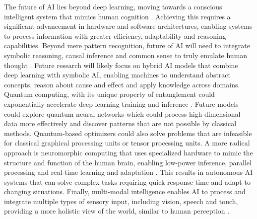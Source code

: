\documentclass[preprint,12pt]{elsarticle}
\begin{document}
The future of AI lies beyond deep learning, moving towards a conscious intelligent system that mimics human cognition \citep{butlin_consciousness_2023}. Achieving this requires a significant advancement in hardware and software architectures, enabling systems to process information with greater efficiency, adaptability and reasoning capabilities. Beyond mere pattern recognition, future of AI will need to integrate symbolic reasoning, causal inference and common sense to truly emulate human thought \citep{marra_statistical_2024, colelough_neuro-symbolic_2025, bhuyan_neuro-symbolic_2024}. Future research will likely focus on hybrid AI models that combine deep learning with symbolic AI, enabling machines to understand abstract concepts, reason about cause and effect and apply knowledge across domains. Quantum computing, with its unique property of entanglement could exponentially accelerate deep learning training and inference \citep{wu_survey_2025, klusch_quantum_2024}. Future models could explore quantum neural networks which could process high dimensional data more effectively and discover patterns that are not possible by classical methods. Quantum-based optimizers could also solve problems that are infeasible for classical graphical processing units or tensor processing units. A more radical approach is neuromorphic computing that uses specialized hardware to mimic the structure and function of the human brain, enabling low-power inference, parallel processing and real-time learning and adaptation \citep{shrestha_survey_2022, kudithipudi_neuromorphic_2025}. This results in autonomous AI systems that can solve complex tasks requiring quick response time and adapt to changing situations. Finally, multi-modal intelligence enables AI to process and integrate multiple types of sensory input, including vision, speech and touch, providing a more holistic view of the world, similar to human perception \citep{fei_towards_2022}.
\end{document}
